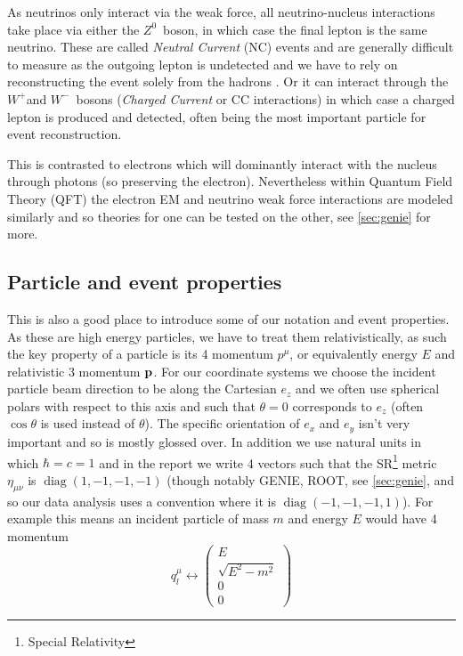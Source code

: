 \documentclass[a4paper,12pt]{article}
\DeclareMathOperator{\diag}{diag}
\newcommand{\Zz}{$Z^0$}
\newcommand{\Wp}{$W^+$}
\newcommand{\Wm}{$W^-$}
\begin{document}
As neutrinos only interact via the weak force, all neutrino-nucleus interactions take place via either the \Zz\ boson, in which case the final lepton is the same neutrino.
These are called \emph{Neutral Current} (NC) events and are generally difficult to measure as the outgoing lepton is undetected and we have to rely on reconstructing the event solely from the hadrons \cite{giustiNeutralCurrentNeutrinonucleus2020}.
Or it can interact through the \Wp and \Wm\ bosons (\emph{Charged Current} or CC interactions) in which case a charged lepton is produced and detected, often being the most important particle for event reconstruction.

This is contrasted to electrons which will dominantly interact with the nucleus through photons (so preserving the electron).
Nevertheless within Quantum Field Theory (QFT) the electron EM and neutrino weak force interactions are modeled similarly and so theories for one can be tested on the other, see \cref{sec:genie} for more.


\subsection{Particle and event properties}
This is also a good place to introduce some of our notation and event properties.
As these are high energy particles, we have to treat them relativistically, as such the key property of a particle is its 4 momentum $p^\mu$, or equivalently energy $E$ and relativistic 3 momentum $\vb{p}$.
For our coordinate systems we choose the incident particle beam direction to be along the Cartesian $e_z$ and we often use spherical polars with respect to this axis and such that $\theta = 0$ corresponds to $e_z$ (often $\cos{\theta}$ is used instead of $\theta$).
The specific orientation of $e_x$ and $e_y$ isn't very important and so is mostly glossed over.
In addition we use natural units in which $\hbar = c = 1$ and in the report we write 4 vectors such that the SR\footnote{Special Relativity} metric $\eta_{\mu \nu}$ is $\diag(1, -1, -1, -1)$ (though notably GENIE, ROOT, see \cref{sec:genie}, and so our data analysis uses a convention where it is $\diag(-1, -1, -1, 1)$).
For example this means an incident particle of mass $m$ and energy $E$ would have 4 momentum
\begin{equation}
    q_l^\mu \leftrightarrow \begin{pmatrix} E \\ \sqrt{E^2 - m^2} \\ 0 \\ 0 \end{pmatrix}
\end{equation}
\end{document}
